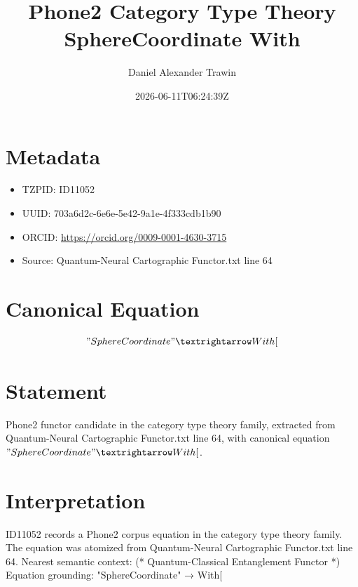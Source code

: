 \documentclass[11pt]{article}
\title{Phone2 Category Type Theory SphereCoordinate With}
\author{Daniel Alexander Trawin}
\date{2026-06-11T06:24:39Z}
\begin{document}
\maketitle
\section*{Metadata}
\begin{itemize}
\item TZPID: ID11052
\item UUID: 703a6d2c-6e6e-5e42-9a1e-4f333cdb1b90
\item ORCID: \url{https://orcid.org/0009-0001-4630-3715}
\item Source: Quantum-Neural Cartographic Functor.txt line 64
\end{itemize}
\section*{Canonical Equation}
\[
"SphereCoordinate" → With[
\]
\section*{Statement}
Phone2 functor candidate in the category type theory family, extracted from Quantum-Neural Cartographic Functor.txt line 64, with canonical equation $"SphereCoordinate" → With[$.
\section*{Interpretation}
ID11052 records a Phone2 corpus equation in the category type theory family. The equation was atomized from Quantum-Neural Cartographic Functor.txt line 64. Nearest semantic context: (* Quantum-Classical Entanglement Functor *) Equation grounding: "SphereCoordinate" → With[
\end{document}
